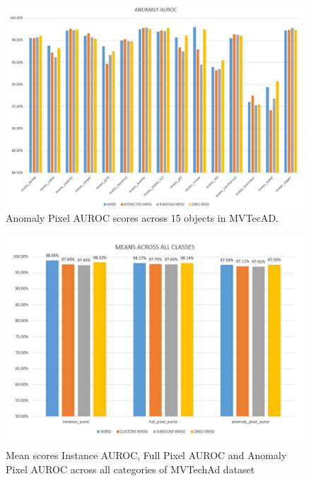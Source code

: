 \begin{figure}[t]
	\begin{center}
		\includegraphics[width=1.0\linewidth]{Chapter_4/wd_anomaly.png}
	\end{center}
	\caption{Anomaly Pixel AUROC scores across 15 objects in MVTecAD.}
	\label{fig:wd_anomaly}
\end{figure}

\begin{figure}[t]
	\begin{center}
		\includegraphics[width=1.0\linewidth]{Chapter_4/wd_mean.png}
	\end{center}
	\caption{Mean scores Instance AUROC, Full Pixel AUROC and Anomaly Pixel AUROC across all categories of MVTechAd dataset}
	\label{fig:wd_mean}
\end{figure}

